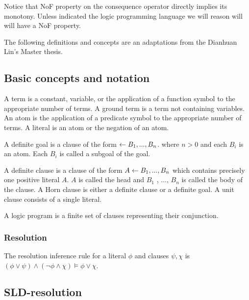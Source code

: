 Notice that NoF property on the consequence operator directly implies its monotony. Unless indicated the logic programming language we will reason will will have a NoF property.

The following definitions and concepts are an adaptations from the Dianhuan Lin's Master thesis\cite{lin2009}.

\subsection{Basic concepts and notation\cite{lin2009}}

\begin{defn}
A term is a constant, variable, or the application of a function symbol to the appropriate number of terms. A ground term is a term not containing variables.
An atom is the application of a predicate symbol to the appropriate number of terms. A literal is an atom or the negation of an atom.
\end{defn}

\begin{defn}
A definite goal is a clause of the form
$\leftarrow B_1 , ..., B_n$.
where $n > 0$ and each $B_i$ is an atom.
Each $B_i$ is called a subgoal of the goal.
\end{defn}

\begin{defn}
A definite clause is a clause of the form
$A \leftarrow B_1 , ..., B_n$
which contains precisely one positive literal $A$.
$A$ is called the head and $B_1$ , ..., $B_n$ is called the body of the clause.
A Horn clause is either a definite clause or a definite goal.
A unit clause consists of a single literal.
\end{defn}

\begin{defn}
A logic program is a finite set of clauses representing their conjunction.
\end{defn}

\subsubsection{Resolution\cite{kimber2011}}
The resolution inference rule for a literal $\phi$ and clauses $\psi, \chi$ is
$(\phi \vee \psi) \wedge (\neg \phi \wedge \chi) \models \phi \vee \chi$.

\subsection{SLD-resolution\cite{lin2009}}

